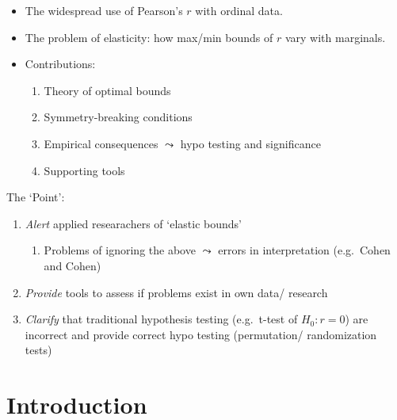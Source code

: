 \documentclass[
  12pt,
]{article}
\providecommand{\tightlist}{%
  \setlength{\itemsep}{0pt}\setlength{\parskip}{0pt}}\usepackage{longtable,booktabs,array}
\theoremstyle{plain}
\theoremstyle{definition}
\theoremstyle{remark}
\begin{document}
\begin{itemize}
\item
  The widespread use of Pearson's \(r\) with ordinal data.\\
\item
  The problem of elasticity: how max/min bounds of \(r\) vary with
  marginals.\\
\item
  Contributions:

  \begin{enumerate}
  \def\labelenumi{\arabic{enumi}.}
  \tightlist
  \item
    Theory of optimal bounds\\
  \item
    Symmetry-breaking conditions\\
  \item
    Empirical consequences \(\leadsto\) hypo testing and significance
  \item
    Supporting tools
  \end{enumerate}
\end{itemize}

The `Point':

\begin{enumerate}
\def\labelenumi{\arabic{enumi}.}
\tightlist
\item
  \emph{Alert} applied researachers of `elastic bounds'

  \begin{enumerate}
  \def\labelenumii{\arabic{enumii}.}
  \tightlist
  \item
    Problems of ignoring the above \(\leadsto\) errors in interpretation
    (e.g.~Cohen and Cohen)
  \end{enumerate}
\item
  \emph{Provide} tools to assess if problems exist in own data/ research
\item
  \emph{Clarify} that traditional hypothesis testing (e.g.~t-test of
  \(H_0: r= 0\)) are incorrect and provide correct hypo testing
  (permutation/ randomization tests)
\end{enumerate}

\section{Introduction}\label{introduction}
\end{document}
